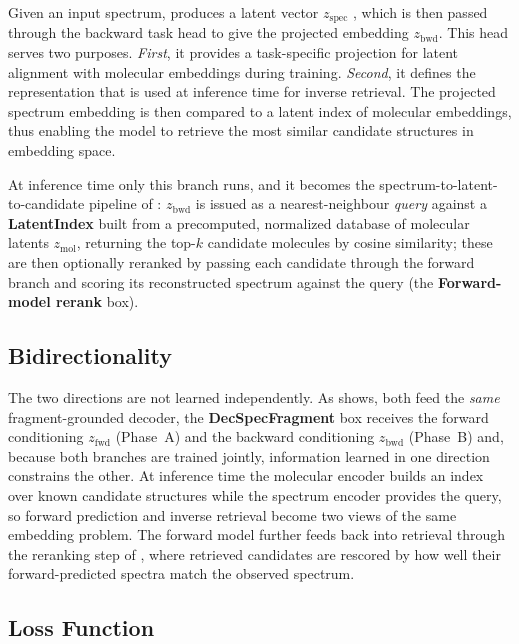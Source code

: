 Given an input spectrum, produces a latent vector $z_{\mathrm{spec}}$ , which is then passed through the backward task head to give the projected embedding $z_{\mathrm{bwd}}$.
This head serves two purposes.
\emph{First}, it provides a task-specific projection for latent alignment with molecular embeddings during training.
\emph{Second}, it defines the representation that is used at inference time for inverse retrieval.
The projected spectrum embedding is then compared to a latent index of molecular embeddings, thus enabling the model to retrieve the most similar candidate structures in embedding space.

At inference time only this branch runs, and it becomes the spectrum-to-latent-to-candidate pipeline of : $z_{\mathrm{bwd}}$ is issued as a nearest-neighbour \emph{query} against a \textbf{LatentIndex} built from a precomputed, normalized database of molecular latents $z_{\mathrm{mol}}$, returning the top-$k$ candidate molecules by cosine similarity; these are then optionally reranked by passing each candidate through the forward branch and scoring its reconstructed spectrum against the query (the \textbf{Forward-model rerank} box).

\subsection{Bidirectionality}

The two directions are not learned independently. As  shows, both feed the \emph{same} fragment-grounded decoder, the \textbf{DecSpecFragment} box receives the forward conditioning $z_{\mathrm{fwd}}$ (Phase~A) and the backward conditioning $z_{\mathrm{bwd}}$ (Phase~B) and, because both branches are trained jointly, information learned in one direction constrains the other.
At inference time the molecular encoder builds an index over known candidate structures while the spectrum encoder provides the query, so forward prediction and inverse retrieval become two views of the same embedding problem.
The forward model further feeds back into retrieval through the reranking step of , where retrieved candidates are rescored by how well their forward-predicted spectra match the observed spectrum.

\subsection{Loss Function}
\label{sec:loss-function}

